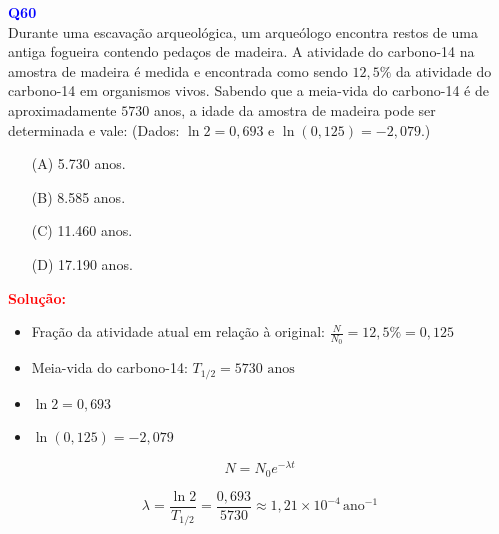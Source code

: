 \documentclass[a4paper,12pt]{article}
\begin{document}
\begin{flushleft}
\textbf{\textcolor{blue}{\Large Q60}}\\
\noindent
Durante uma escavação arqueológica, um arqueólogo encontra restos de uma antiga fogueira contendo pedaços de madeira.  
A atividade do carbono-14 na amostra de madeira é medida e encontrada como sendo \(12{,}5\%\) da atividade do carbono-14 em organismos vivos.  
Sabendo que a meia-vida do carbono-14 é de aproximadamente \(5730\) anos, a idade da amostra de madeira pode ser determinada e vale:  
(Dados: \(\ln 2 = 0{,}693\) e \(\ln(0{,}125) = -2{,}079\).)

\begin{itemize}
\item[(A)] 5.730 anos.
\item[(B)] 8.585 anos.
\item[(C)] 11.460 anos.
\item[(D)] 17.190 anos.
\end{itemize}

\vspace{0.5cm}

\textcolor{red}{\textbf{Solução:}}\\


\begin{itemize}
    \item Fração da atividade atual em relação à original: \(\frac{N}{N_0} = 12{,}5\% = 0{,}125\)
    \item Meia-vida do carbono-14: \(T_{1/2} = 5730 \text{ anos}\)
    \item \(\ln 2 = 0{,}693\)
    \item \(\ln(0{,}125) = -2{,}079\)
\end{itemize}

\vspace{0.3cm}


\[
N = N_0 e^{-\lambda t}
\]


\vspace{0.3cm}


\[
\lambda = \frac{\ln 2}{T_{1/2}} = \frac{0{,}693}{5730} \approx 1{,}21 \times 10^{-4}\, \text{ano}^{-1}
\]

\vspace{0.3cm}


\end{flushleft}
\end{document}
